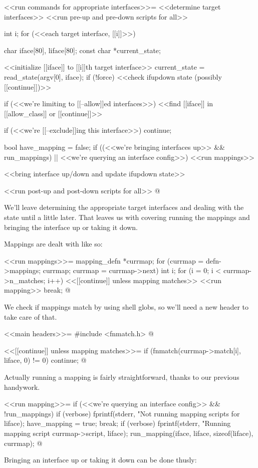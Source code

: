 \documentclass{article}
\begin{document}
<<run commands for appropriate interfaces>>=
<<determine target interfaces>>
<<run pre-up and pre-down scripts for all>>
{
	int i;
	for (<<each target interface, [[i]]>>) {
		char iface[80], liface[80];
		const char *current_state;

		<<initialize [[iface]] to [[i]]th target interface>>
		current_state = read_state(argv[0], iface);
		if (!force) {
			<<check ifupdown state (possibly [[continue]])>>
		}

		if (<<we're limiting to [[--allow]]ed interfaces>>) {
			<<find [[iface]] in [[allow_class]] or [[continue]]>>
		}

		if (<<we're [[--exclude]]ing this interface>>)  
			continue;

		bool have_mapping = false;
		if ((<<we're bringing interfaces up>> && run_mappings) || <<we're querying an interface config>>) {
			<<run mappings>>
		}

		<<bring interface up/down and update ifupdown state>>
	}
}
<<run post-up and post-down scripts for all>>
@

We'll leave determining the appropriate target interfaces and dealing
with the state until a little later. That leaves us with covering running
the mappings and bringing the interface up or taking it down.

Mappings are dealt with like so:

<<run mappings>>=
{
	mapping_defn *currmap;
	for (currmap = defn->mappings; currmap; currmap = currmap->next) {
		int i;
		for (i = 0; i < currmap->n_matches; i++) {
			<<[[continue]] unless mapping matches>>
			<<run mapping>>
			break;
		}
	}
}
@

We check if mappings match by using shell globs, so we'll need a new header
to take care of that.

<<main headers>>=
#include <fnmatch.h>
@ 

<<[[continue]] unless mapping matches>>=
if (fnmatch(currmap->match[i], liface, 0) != 0)
	continue;
@

Actually running a mapping is fairly straightforward, thanks to our
previous handywork.

<<run mapping>>=
if (<<we're querying an interface config>> && !run_mappings) {
	if (verbose) {
		fprintf(stderr, "Not running mapping scripts for %
			liface);
	}
	have_mapping = true;
	break;
}
if (verbose) {
	fprintf(stderr, "Running mapping script %
		currmap->script, liface);
}
run_mapping(iface, liface, sizeof(liface), currmap);
@

Bringing an interface up or taking it down can be done thusly:
\end{document}

